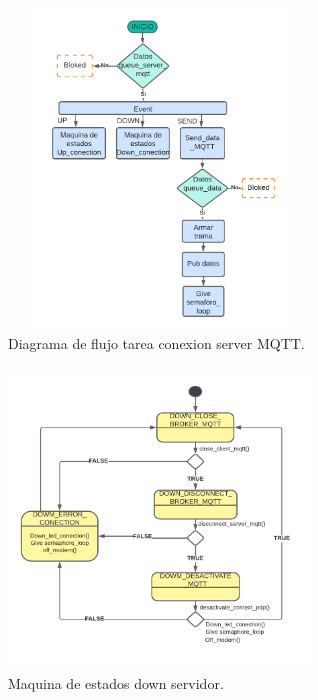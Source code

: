 \begin{figure}[h]
  \centering
	\includegraphics[width=8cm, height=8.5cm]{./Figures/DF general task conection.png}
	\caption{Diagrama de flujo tarea conexion server MQTT.}
	\label{fig:Df tarea conexion}
\end{figure}

\begin{figure}[h]
  \centering
  \includegraphics[width=8cm, height=8cm]{./Figures/SM down server.png}
  \caption{Maquina de estados down servidor.}
  \label{fig:Maquina de estados dowm servidor}
\end{figure}
\clearpage
\hspace{0.5cm}


